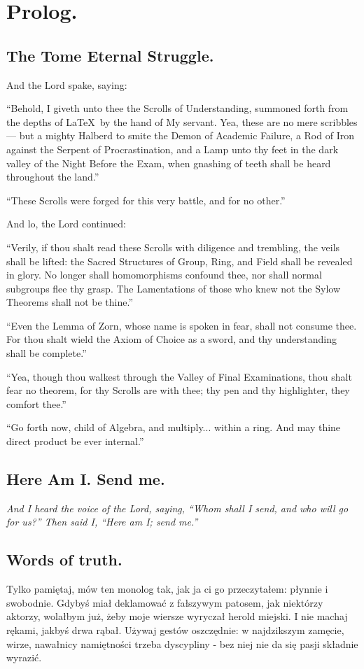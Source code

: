 \chapter*{Prolog.}
\section*{The Tome Eternal Struggle.}

And the Lord spake, saying:

“Behold, I giveth unto thee the Scrolls of Understanding, summoned forth from the depths of \LaTeX\ by the hand of My servant. Yea, these are no mere scribbles — but a mighty Halberd to smite the Demon of Academic Failure, a Rod of Iron against the Serpent of Procrastination, and a Lamp unto thy feet in the dark valley of the Night Before the Exam, when gnashing of teeth shall be heard throughout the land.”

“These Scrolls were forged for this very battle, and for no other.”

And lo, the Lord continued:

“Verily, if thou shalt read these Scrolls with diligence and trembling, the veils shall be lifted: the Sacred Structures of Group, Ring, and Field shall be revealed in glory. No longer shall homomorphisms confound thee, nor shall normal subgroups flee thy grasp. The Lamentations of those who knew not the Sylow Theorems shall not be thine.”

“Even the Lemma of Zorn, whose name is spoken in fear, shall not consume thee. For thou shalt wield the Axiom of Choice as a sword, and thy understanding shall be complete.”

“Yea, though thou walkest through the Valley of Final Examinations, thou shalt fear no theorem, for thy Scrolls are with thee; thy pen and thy highlighter, they comfort thee.”

“Go forth now, child of Algebra, and multiply... within a ring. And may thine direct product be ever internal.”

\section*{Here Am I. Send me.}
\textit{And I heard the voice of the Lord, saying,
“Whom shall I send, and who will go for us?”
Then said I, “Here am I; send me.”} 

\section*{Words of truth.}
Tylko pamiętaj, mów ten monolog tak, jak ja ci go przeczytałem: płynnie i swobodnie. Gdybyś miał deklamować z fałszywym patosem, jak niektórzy aktorzy, wolałbym już, żeby moje wiersze wyryczał herold miejski. I nie machaj rękami, jakbyś drwa rąbał. Używaj gestów oszczędnie: w najdzikszym zamęcie, wirze, nawałnicy namiętności trzeba dyscypliny - bez niej nie da się pasji składnie wyrazić.

